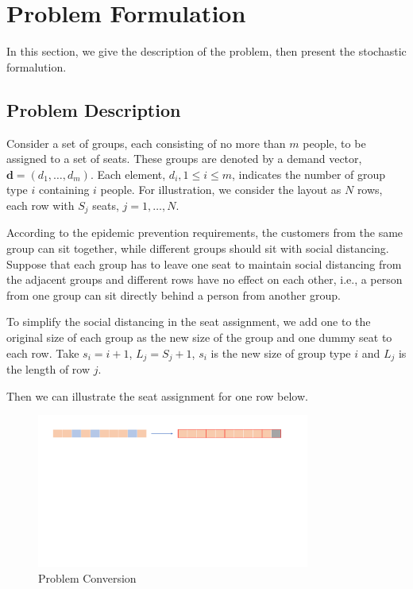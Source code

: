\section{Problem Formulation}
In this section, we give the description of the problem, then present the stochastic formalution.

\subsection{Problem Description}

Consider a set of groups, each consisting of no more than $m$ people, to be assigned to a set of seats. These groups are denoted by a demand vector, $\mathbf{d} = (d_1, \ldots, d_m)$. Each element, $d_i, 1 \leq i \leq m$, indicates the number of group type $i$ containing $i$ people. For illustration, we consider the layout as $N$ rows, each row with $S_{j}$ seats, $j = 1, \ldots, N$. 


According to the epidemic prevention requirements, the customers from the same group can sit together, while different groups should sit with social distancing. 
Suppose that each group has to leave one seat to maintain social distancing from the adjacent groups and different rows have no effect on each other, i.e., a person from one group can sit directly behind a person from another group.

To simplify the social distancing in the seat assignment, we add one to the original size of each group as the new size of the group and one dummy seat to each row. Take $s_{i} = i + 1$, $L_{j} = S_{j} +1$, $s_{i}$ is the new size of group type $i$ and $L_{j}$ is the length of row $j$.

Then we can illustrate the seat assignment for one row below. 

\begin{figure}[ht]
    \centering
    \includegraphics[width = 0.8\textwidth]{./Figures/dummy_seat.pdf}
    \caption{Problem Conversion}
\end{figure}

